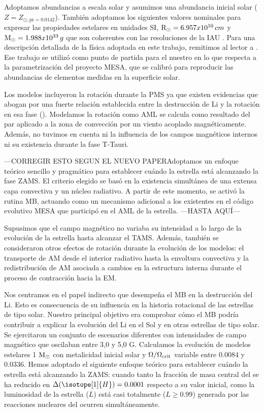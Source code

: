 Adoptamos abundancias a escala solar y asumimos una abundancia inicial solar ($Z = Z_{\odot, \mathrm{pr} = 0.0142}$). También adoptamos los siguientes valores nominales para expresar las propiedades estelares en unidades SI, $\mathrm{R}_\odot = 6.957x10^{10}\, cm$ y $\mathrm{M}_\odot = 1.988x10^{33}\, g$ que son coherentes con las resoluciones de la IAU \cite{Mamajek2015}. Para una descripción detallada de la física adoptada en este trabajo, remitimos al lector a \cite{Choi2016}. Ese trabajo se utilizó como punto de partida para el nuestro en lo que respecta a la parametrización del proyecto MESA, que se calibró para reproducir las abundancias de elementos medidas en la superficie solar.\par

Los modelos incluyeron la rotación durante la PMS ya que existen evidencias que abogan por una fuerte relación establecida entre la destrucción de Li y la rotación en esa fase (\cite{Bouvier2016,Bouvier2018}). Modelamos la rotación como AML se calcula como resultado del par aplicado a la zona de convección por un viento acoplado magnéticamente. Además, no tuvimos en cuenta ni la influencia de los campos magnéticos internos ni su existencia durante la fase T-Tauri.\par 
---CORREGIR ESTO SEGUN EL NUEVO PAPERAdoptamos un enfoque teórico sencillo y pragmático para establecer cuándo la estrella está alcanzando la fase ZAMS. El criterio elegido se basó en la existencia simultánea de una extensa capa convectiva y un núcleo radiativo. A partir de este momento, se activó la rutina MB, actuando como un mecanismo adicional a los existentes en el código evolutivo MESA que participó en el AML de la estrella. ---HASTA AQUÍ---\par

Supusimos que el campo magnético no variaba su intensidad a lo largo de la evolución de la estrella hasta alcanzar el TAMS. Además, también se consideraron otros efectos de rotación durante la evolución de los modelos: el transporte de AM desde el interior radiativo hasta la envoltura convectiva y la redistribución de AM asociada a cambios en la estructura interna durante el proceso de contracción hacia la EM.\par

Nos centramos en el papel indirecto que desempeña el MB en la destrucción del Li. Esto es consecuencia de su influencia en la historia rotacional de las estrellas de tipo solar. Nuestro principal objetivo era comprobar cómo el MB podría contribuir a explicar la evolución del Li en el Sol y en otras estrellas de tipo solar. Se ejercitaron un conjunto de escenarios diferentes con intensidades de campo magnético que oscilaban entre 3,0 y 5,0 G. Calculamos la evolución de modelos estelares 1 $\mathrm{M}_\odot$ con metalicidad inicial solar y $\Omega / \Omega_{\mathrm{crit}}$ variable entre $0.0084$ y $0.0336$. Hemos adoptado el siguiente enfoque teórico para establecer cuándo la estrella está alcanzando la ZAMS: cuando tanto la fracción de masa central del  se ha reducido en $\Delta( \isotope[1]{H})= 0.0001$ respecto a su valor inicial, como la luminosidad de la estrella ($L$) está casi totalmente ($L \geq 0.99$) generada por las reacciones nucleares del  ocurren simultáneamente. \par

